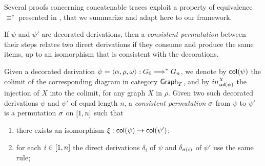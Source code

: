 { %
 

Several proofs concerning concatenable traces exploit a 
property of equivalence $\equiv^c$ presented in \cite[Sec. 3.5]{Handbook}, 
that we summarize and adapt here to our framework. 


If $\psi$ and $\psi'$ are decorated derivations, then a \emph{consistent permutation}
between their steps relates two direct derivations if they consume
and produce the same items, up to an isomorphism that is consistent with the decorations.

%

%
%
%

\begin{definition}
\label{de:consistent_permutation}

Given a decorated derivation  $\psi = \langle \alpha, \rho, \omega \rangle:  G_0 \stackrel{{}}{\Longrightarrow}^* G_n$, 
we denote by $\mathsf{col}({\psi})$ the colimit of the corresponding diagram in category $\mathsf{Graph}_{T}$, and by $in^X_{\mathsf{col}({\psi})}$
the injection of $X$ into the colimit, for any graph $X$ in $\rho$.
Given two such decorated derivations $\psi$ and $\psi'$ of equal length $n$, 
a \emph{consistent permutation} $\sigma$ from $\psi$ to $\psi'$ is a permutation
$\sigma$ on $[{1},{n}]$ such that
\begin{enumerate}
\item there exists an isomorphism $\xi: \mathsf{col}({\psi}) \to \mathsf{col}({\psi'})$;
\item for each $i \in [{1},{n}]$ the direct derivations $\delta_i$ of $\psi$ and $\delta_{\sigma(i)}$ of $\psi'$
use the same rule;


\end{enumerate}
\end{definition}}
